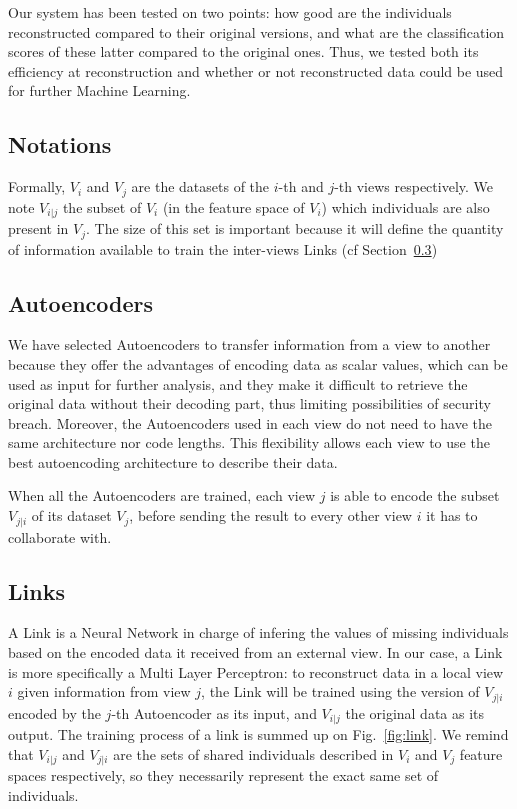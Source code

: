 Our system has been tested on two points: how good are the individuals reconstructed compared to their original versions, and what are the classification scores of these latter compared to the original ones. Thus, we tested both its efficiency at reconstruction and whether or not reconstructed data could be used for further Machine Learning.

\subsection{Notations}
\label{sec:precond}
Formally, $V_i$ and $V_j$ are the datasets of the $i$-th and $j$-th views respectively. We note $V_{i|j}$ the subset of $V_i$ (in the feature space of $V_i$) which individuals are also present in $V_j$. The size of this set is important because it will define the quantity of information available to train the inter-views Links (cf Section~\ref{sec:links})
	
		\subsection{Autoencoders}
\label{sec:dae}
		
We have selected Autoencoders to transfer information from a view to another because they offer the advantages of encoding data as scalar values, which can be used as input for further analysis, and they make it difficult to retrieve the original data without their decoding part, thus limiting possibilities of security breach. Moreover, the Autoencoders used in each view do not need to have the same architecture nor code lengths. This flexibility allows each view to use the best autoencoding architecture to describe their data.
		
When all the Autoencoders are trained, each view $j$ is able to encode the subset $V_{j|i}$ of its dataset $V_j$, before sending the result to every other view $i$ it has to collaborate with.
		
		\subsection{Links}
\label{sec:links}
A Link is a Neural Network in charge of infering the values of missing individuals based on the encoded data it received from an external view. In our case, a Link is more specifically a Multi Layer Perceptron: to reconstruct data in a local view $i$ given information from view $j$, the Link will be trained using the version of $V_{j|i}$ encoded by the $j$-th Autoencoder as its input, and $V_{i|j}$ the original data as its output. The training process of a link is summed up on Fig.~\ref{fig:link}. We remind that $V_{i|j}$ and $V_{j|i}$ are the sets of shared individuals described in $V_i$ and $V_j$ feature spaces respectively, so they necessarily represent the exact same set of individuals.

